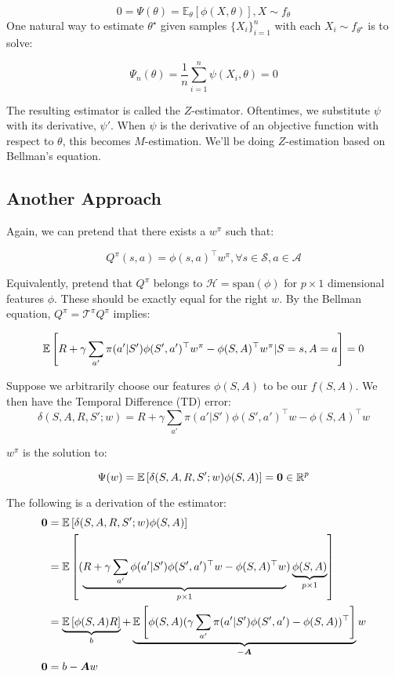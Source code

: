\documentclass[11pt]{article}
\begin{document}
$$0 = \Psi(\theta) = \mathbb{E}_\theta\left[\phi(X,\theta)\right], X \sim f_\theta$$
One natural way to estimate $\theta^\star$ given samples $\{X_i\}_{i = 1}^n$ with each $X_i \sim f_{\theta^\star}$ is to solve:

$$\Psi_n(\theta) = \frac{1}{n} \sum_{i=1}^n \psi(X_i, \theta) = 0$$

The resulting estimator is called the $Z$-estimator. Oftentimes, we substitute $\psi$ with its derivative, $\psi'$. When $\psi$ is the derivative of an objective function with respect to $\theta$, this becomes $M$-estimation. We'll be doing $Z$-estimation based on Bellman's equation.

\subsection{Another Approach}

Again, we can pretend that there exists a $w^\pi$ such that:

$$Q^\pi(s, a) = \phi(s, a)^\top w^\pi, \forall s \in \mathcal{S}, a \in \mathcal{A}$$

Equivalently, pretend that $Q^\pi$ belongs to $\mathcal{H} = \text{span}(\phi)$ for $p \times 1$ dimensional features $\phi$. 
These should be exactly equal for the right $w$. By the Bellman equation, $Q^\pi = \mathcal{T}^\pi Q^\pi$ implies:

$$\mathbb{E}\left[ R + \gamma \sum_{a'} \pi(a' | S') \phi(S', a')^\top w^\pi - \phi(S, A)^\top w^\pi | S = s, A = a \right] = 0$$

Suppose we arbitrarily choose our features $\phi(S,A)$ to be our $f(S,A)$. We then have the Temporal Difference (TD) error:
$$\delta(S,A,R, S';w) = R + \gamma \sum_{a'} \pi(a' | S') \phi(S', a')^\top w - \phi(S, A)^\top w$$

$w^\pi$ is the solution to:

$$\Psi(w) = \mathbb{E}\left[ \delta(S,A, R, S'; w) \phi(S,A) \right] = \mathbf{0} \in \mathbb{R}^p$$

The following is a derivation of the estimator:
\begin{align*}
\boldsymbol{0} &= \mathbb{E}\left[ \delta(S,A,R,S'; w) \phi(S,A) \right] \\
&=\mathbb{E}\left[ (\underbrace{R+\gamma \sum_{a'} \phi(a'|S')\phi(S', a')^\top w - \phi(S,A)^\top w}_{p \times 1})\underbrace{\phi(S,A)}_{p \times 1} \right] \\
&=\underbrace{\mathbb{E}\left[ \phi(S,A)R \right]}_b + \underbrace{\mathbb{E}\left[ \phi(S,A) (\gamma \sum_{a'} \pi(a'|S')\phi(S', a') - \phi(S,A))^\top \right]}_{-\boldsymbol{A}}w \\
\boldsymbol{0} &= b - \boldsymbol{A}w
\end{align*}
\end{document}
